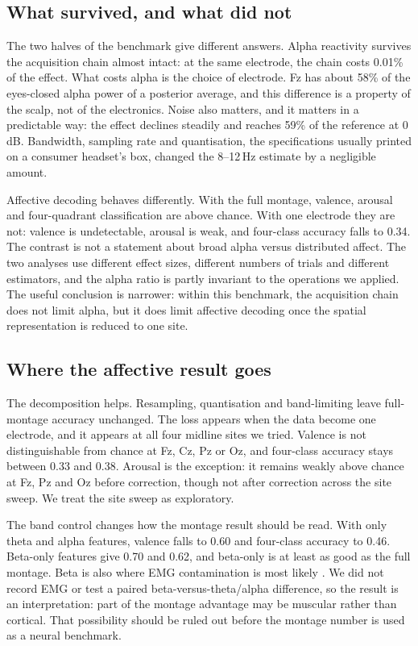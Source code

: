 \subsection*{What survived, and what did not}
The two halves of the benchmark give different answers. Alpha reactivity survives the
acquisition chain almost intact: at the same electrode, the chain costs 0.01\% of the
effect. What costs alpha is the choice of electrode. Fz has about 58\% of the
eyes-closed alpha power of a posterior average, and this difference is a property of the
scalp, not of the electronics. Noise also matters, and it matters in a predictable way:
the effect declines steadily and reaches 59\% of the reference at 0\,dB. Bandwidth,
sampling rate and quantisation, the specifications usually printed on a consumer
headset's box, changed the 8--12\,Hz estimate by a negligible amount.

Affective decoding behaves differently. With the full montage, valence, arousal and
four-quadrant classification are above chance. With one electrode they are not: valence
is undetectable, arousal is weak, and four-class accuracy falls to 0.34. The contrast is
not a statement about broad alpha versus distributed affect. The two analyses use
different effect sizes, different numbers of trials and different estimators, and the
alpha ratio is partly invariant to the operations we applied. The useful conclusion is
narrower: within this benchmark, the acquisition chain does not limit alpha, but it does
limit affective decoding once the spatial representation is reduced to one site.

\subsection*{Where the affective result goes}
The decomposition helps. Resampling, quantisation and band-limiting leave full-montage
accuracy unchanged. The loss appears when the data become one electrode, and it appears
at all four midline sites we tried. Valence is not distinguishable from chance at Fz,
Cz, Pz or Oz, and four-class accuracy stays between 0.33 and 0.38. Arousal is the
exception: it remains weakly above chance at Fz, Pz and Oz before correction, though not
after correction across the site sweep. We treat the site sweep as exploratory.

The band control changes how the montage result should be read. With only theta and alpha
features, valence falls to 0.60 and four-class accuracy to 0.46. Beta-only features give
0.70 and 0.62, and beta-only is at least as good as the full montage. Beta is also where
EMG contamination is most likely \citep{whitham2007emg,goncharova2003emg}. We did not
record EMG or test a paired beta-versus-theta/alpha difference, so the result is an
interpretation: part of the montage advantage may be muscular rather than cortical. That
possibility should be ruled out before the montage number is used as a neural benchmark.

